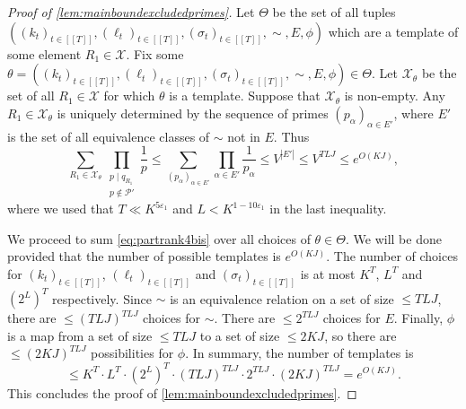 \documentclass[11pt]{amsart}
\theoremstyle{definition}
\renewcommand{\leq}{\leqslant}
\newcommand{\sinterval}[1]{[\![#1]\!] }
\newcommand{\abs}[1]{\left|#1\right|}
\newcommand{\eps}{\varepsilon}
\newcommand{\primes}{\mathcal{P}}
\newcommand{\cstH}{\eps_1}
\newcommand{\rankcutoff}{\repK^{5\cstH}}
\newcommand{\boundelln}{\repK^{1-10\cstH}}
\newcommand{\curlyL}{V}
\newcommand{\elln}{L}
\newcommand{\complementE}{E'}
\newcommand{\modulus}{q}
\newcommand{\repR}{J}
\newcommand{\repK}{K}
\newcommand{\template}{\theta}
\newcommand{\ncond}{T}
\newcommand{\somesigns}{\sigma}
\newcommand{\sset}{\primes'}
\begin{document}
\begin{proof}[Proof of \cref{lem:mainboundexcludedprimes}]
Let $\Theta$ be the set of all tuples $((k_t)_{t\in \sinterval{\ncond}}, (\ell_t)_{t\in \sinterval{\ncond}}, (\somesigns_t)_{t\in \sinterval{\ncond}}, \sim, E, \phi)$ which are a template of some element $R_1 \in \mathcal{X}$. Fix some $\template = ((k_t)_{t\in \sinterval{\ncond}}, (\ell_t)_{t\in \sinterval{\ncond}}, (\somesigns_t)_{t\in \sinterval{\ncond}}, \sim, E, \phi) \in \Theta$. Let $\mathcal{X}_\template$ be the set of all $R_1\in \mathcal{X}$ for which $\template$ is a template. Suppose that $\mathcal{X}_\template$ is non-empty. Any $R_1\in \mathcal{X}_\template$ is uniquely determined by the sequence of primes $(p_{\alpha})_{\alpha\in \complementE}$, where $\complementE$ is the set of all equivalence classes of $\sim$ not in $E$. Thus
\begin{equation}
\label{eq:partrank4bis}
	\sum_{R_1\in \mathcal{X}_\template}  \prod_{\substack{p\mid \modulus_{R_1}\\ p\not\in \sset}}\frac{1}{p} \leq \sum_{(p_{\alpha})_{\alpha\in \complementE}} \prod_{\alpha\in \complementE} \frac{1}{p_{\alpha}} \leq \curlyL^{\abs{\complementE}} \leq \curlyL^{\ncond \elln \repR} \leq e^{O(\repK\repR)},
\end{equation}
where we used that $\ncond \ll \rankcutoff$ and $\elln<\boundelln$ in the last inequality. 

We proceed to sum \cref{eq:partrank4bis} over all choices of $\template\in \Theta$. We will be done provided that the number of possible templates is $e^{O(\repK\repR)}$. The number of choices for $(k_t)_{t\in \sinterval{\ncond}}$, $(\ell_t)_{t\in \sinterval{\ncond}}$ and $(\somesigns_t)_{t\in \sinterval{\ncond}}$ is at most $\repK^{\ncond}$, $\elln^{\ncond}$ and $(2^{\elln})^{\ncond}$ respectively. Since $\sim$ is an equivalence relation on a set of size $\leq \ncond \elln \repR$, there are $\leq (\ncond \elln \repR)^{\ncond \elln \repR}$ choices for $\sim$. There are $\leq 2^{\ncond \elln \repR}$ choices for $E$. Finally, $\phi$ is a map from a set of size $\leq \ncond \elln \repR$ to a set of size $\leq 2 \repK\repR$, so there are $\leq (2\repK\repR)^{\ncond \elln \repR}$ possibilities for $\phi$. In summary, the number of templates is
\begin{equation*}
 \leq \repK^{\ncond} \cdot \elln^{\ncond} \cdot (2^{\elln})^{\ncond} \cdot (\ncond \elln \repR)^{\ncond \elln \repR} \cdot 2^{\ncond \elln \repR} \cdot (2\repK\repR)^{\ncond \elln \repR} = e^{O(\repK\repR)}.
\end{equation*}
This concludes the proof of \cref{lem:mainboundexcludedprimes}.
\end{proof}
\end{document}
